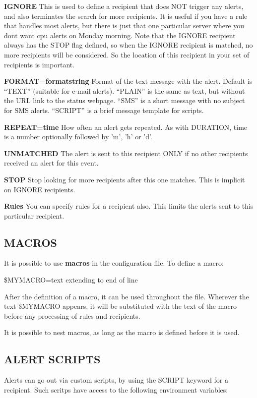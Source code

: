  \textbf{IGNORE}
 This is used to define a recipient that does NOT trigger any alerts, and also terminates the search for more recipients. It is useful if you have a rule that handles most alerts, but there is just that one particular server where you dont want cpu alerts on Monday morning. Note that the IGNORE recipient always has the STOP flag defined, so when the IGNORE recipient is matched, no more recipients will be considered. So the location of this recipient in your set of recipients is important. 


 \textbf{FORMAT=formatstring}
 Format of the text message with the alert. Default is ``TEXT'' (suitable for e-mail alerts). ``PLAIN'' is the same as text, but without the URL link to the status webpage. ``SMS'' is a short message with no subject for SMS alerts. ``SCRIPT'' is a brief message template for scripts. 


 \textbf{REPEAT=time}
 How often an alert gets repeated. As with DURATION, time is a number optionally followed by 'm', 'h' or 'd'. 


 \textbf{UNMATCHED}
 The alert is sent to this recipient ONLY if no other recipients received an alert for this event. 


 \textbf{STOP}
 Stop looking for more recipients after this one matches. This is implicit on IGNORE recipients. 


 \textbf{Rules}
 You can specify rules for a recipient also. This limits the alerts sent to this particular recipient. 


 
\subsection{MACROS}
 It is possible to use \textbf{macros}
 in the configuration file. To define a macro: 

 \$MYMACRO=text extending to end of line 



  After the definition of a macro, it can be used throughout the file. Wherever the text \$MYMACRO appears, it will be substituted with the text of the macro before any processing of rules and recipients. 


  It is possible to nest macros, as long as the macro is defined before it is used. 


 
\subsection{ALERT SCRIPTS}
 Alerts can go out via custom scripts, by using the SCRIPT keyword for a recipient. Such scritps have access to the following environment variables: 

